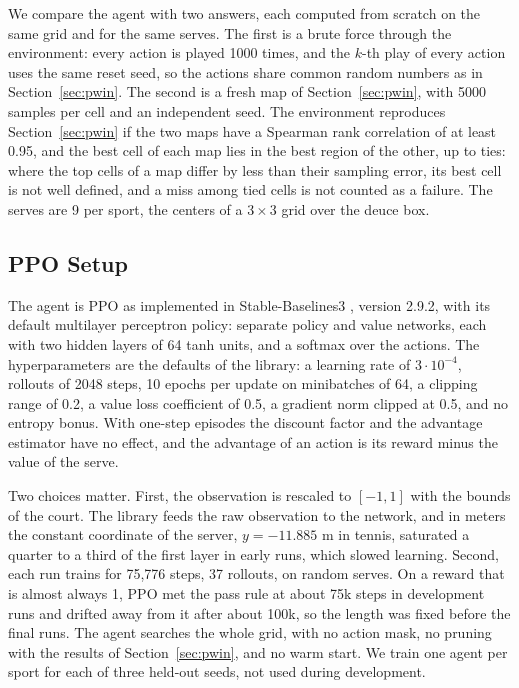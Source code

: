   We compare the agent with two answers, each computed from scratch on the same
  grid and for the same serves. The first is a brute force through the
  environment: every action is played 1000 times, and the $k$-th play of every
  action uses the same reset seed, so the actions share common random numbers
  as in Section~\ref{sec:pwin}. The second is a fresh map of
  Section~\ref{sec:pwin}, with 5000 samples per cell and an independent seed.
  The environment reproduces Section~\ref{sec:pwin} if the two maps have a
  Spearman rank correlation of at least 0.95, and the best cell of each map lies
  in the best region of the other, up to ties: where the top cells of a map
  differ by less than their sampling error, its best cell is not well defined,
  and a miss among tied cells is not counted as a failure. The serves are 9 per
  sport, the centers of a $3 \times 3$ grid over the deuce box.

  \subsection{PPO Setup}\label{sec:ppo}

  The agent is PPO \cite{schulman2017ppo} as implemented in Stable-Baselines3
  \cite{raffin2021sb3}, version 2.9.2, with its default multilayer perceptron
  policy: separate policy and value networks, each with two hidden layers of 64
  tanh units, and a softmax over the actions. The hyperparameters are the
  defaults of the library: a learning rate of $3 \cdot 10^{-4}$, rollouts of
  2048 steps, 10 epochs per update on minibatches of 64, a clipping range of
  0.2, a value loss coefficient of 0.5, a gradient norm clipped at 0.5, and no
  entropy bonus. With one-step episodes the discount factor and the advantage
  estimator have no effect, and the advantage of an action is its reward minus
  the value of the serve.

  Two choices matter. First, the observation is rescaled to $[-1, 1]$ with the
  bounds of the court. The library feeds the raw observation to the network,
  and in meters the constant coordinate of the server, $y = -11.885$ m in
  tennis, saturated a quarter to a third of the first layer in early runs,
  which slowed learning. Second, each run trains for 75,776 steps, 37 rollouts,
  on random serves. On a reward that is almost always 1, PPO met the pass rule
  at about 75k steps in development runs and drifted away from it after about
  100k, so the length was fixed before the final runs. The agent searches the
  whole grid, with no action mask, no pruning with the results of
  Section~\ref{sec:pwin}, and no warm start. We train one agent per sport for
  each of three held-out seeds, not used during development.

